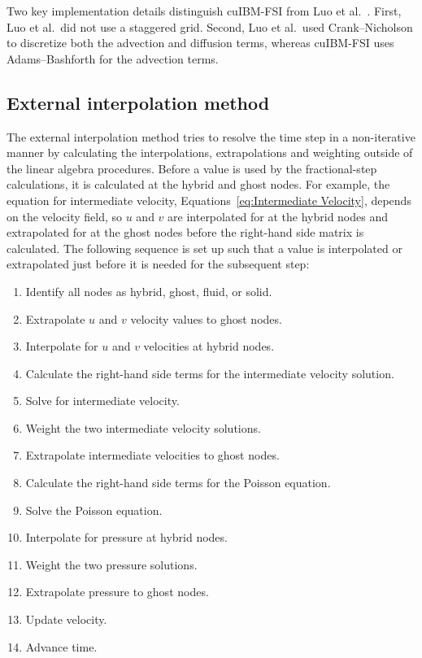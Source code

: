 Two key implementation details distinguish cuIBM-FSI from Luo et al.~\cite{Luo:2012gx}. 
First, Luo et al.~did not use a staggered grid. 
Second, Luo et al.~used Crank--Nicholson to discretize both the advection and diffusion terms, whereas cuIBM-FSI uses Adams--Bashforth for the advection terms. 

\subsection{External interpolation method}
\label{sec:ID external}
The external interpolation method tries to resolve the time step in a non-iterative manner by calculating the interpolations, extrapolations and weighting outside of the linear algebra procedures. 
Before a value is used by the fractional-step calculations, it is calculated at the hybrid and ghost nodes. 
For example, the equation for intermediate velocity, Equations~\eqref{eq:Intermediate Velocity}, depends on the velocity field, so $u$ and $v$ are interpolated for at the hybrid nodes and extrapolated for at the ghost nodes before the right-hand side matrix is calculated. 
The following sequence is set up such that a value is interpolated or extrapolated just before it is needed for the subsequent step:


\begin{enumerate}
	\item Identify all nodes as hybrid, ghost, fluid, or solid. 
	\item Extrapolate $u$ and $v$ velocity values to ghost nodes. 
	\item Interpolate for $u$ and $v$ velocities at hybrid nodes. 
	\item Calculate the right-hand side terms for the intermediate velocity solution. 
	\item Solve for intermediate velocity. 
	\item Weight the two intermediate velocity solutions. 
	\item Extrapolate intermediate velocities to ghost nodes. 
	\item Calculate the right-hand side terms for the Poisson equation. 
	\item Solve the Poisson equation. 
	\item Interpolate for pressure at hybrid nodes. 
	\item Weight the two pressure solutions. 
	\item Extrapolate pressure to ghost nodes. 
	\item Update velocity. 
	\item Advance time. 
\end{enumerate}

